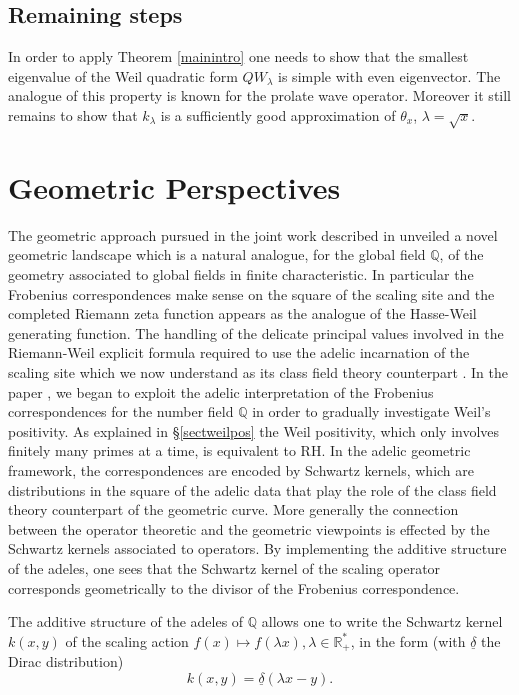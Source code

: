 \documentclass{article}
\def\Q{{\mathbb Q}}
\begin{document}
\subsection{Remaining steps}\label{miss} In order to apply Theorem \ref{mainintro} one needs to show that the smallest eigenvalue of the Weil quadratic form $QW_\lambda$ is simple with even eigenvector. The analogue of this property is known for the prolate wave operator. Moreover it still remains to show that  $k_\lambda$ is a sufficiently good approximation of $\theta_x$, $\lambda=\sqrt x$.

\section{Geometric Perspectives}
The geometric approach pursued in the joint work  \cite{ConnesConsaniTopos}  described in \cite{Essay}  unveiled a novel geometric landscape which is a natural analogue, for the global field $\Q$, of the geometry  associated to  global fields in finite characteristic. In particular the Frobenius correspondences make sense on the square of the scaling site and the completed Riemann zeta function appears as the analogue of the Hasse-Weil generating function. The  handling of the delicate principal values involved in the Riemann-Weil explicit formula required to use the adelic incarnation of the scaling site which we now understand as its class field theory counterpart \cite{ccknots}.\newline
In the paper \cite{weilpos}, we began to exploit the adelic interpretation of the Frobenius correspondences for the number field $\Q$ in order to gradually investigate Weil's positivity. As explained in \S \ref{sectweilpos} the Weil positivity, which only involves finitely many primes at a time, is equivalent to RH. In the adelic geometric framework, the correspondences are encoded by Schwartz kernels, which are distributions in the square of the adelic data that play the role of the class field theory counterpart of the geometric curve. More generally the connection between the operator theoretic and the geometric viewpoints is effected by the Schwartz kernels associated to operators. By implementing the additive structure of the adeles, one sees that the Schwartz kernel of the scaling operator corresponds geometrically to the divisor of the Frobenius correspondence.
 \begin{graybox} The additive structure of the adeles of $\mathbb{Q}$ allows one to write the Schwartz kernel $k(x, y)$ of the scaling action $f(x) \mapsto f(\lambda x), \lambda \in \mathbb{R}_{+}^*$, in the form (with $\underline{\delta}$  the Dirac distribution)
$$
k(x, y)=\underline{\delta}(\lambda x-y). 
$$
\end{graybox}
\end{document}
